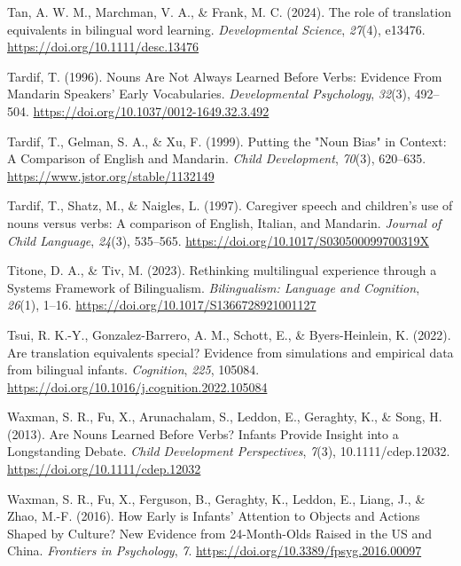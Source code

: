 \documentclass[10pt, letterpaper]{article}
\begin{document}
\begin{CSLReferences}{1}{0}
Tan, A. W. M., Marchman, V. A., \& Frank, M. C. (2024). The role of
translation equivalents in bilingual word learning. \emph{Developmental
Science}, \emph{27}(4), e13476. \url{https://doi.org/10.1111/desc.13476}

Tardif, T. (1996). Nouns {Are Not Always Learned Before Verbs}:
{Evidence From Mandarin Speakers}' {Early Vocabularies}.
\emph{Developmental Psychology}, \emph{32}(3), 492--504.
\url{https://doi.org/10.1037/0012-1649.32.3.492}

Tardif, T., Gelman, S. A., \& Xu, F. (1999). Putting the "{Noun Bias}"
in {Context}: {A Comparison} of {English} and {Mandarin}. \emph{Child
Development}, \emph{70}(3), 620--635.
\url{https://www.jstor.org/stable/1132149}

Tardif, T., Shatz, M., \& Naigles, L. (1997). Caregiver speech and
children's use of nouns versus verbs: {A} comparison of {English},
{Italian}, and {Mandarin}. \emph{Journal of Child Language},
\emph{24}(3), 535--565. \url{https://doi.org/10.1017/S030500099700319X}

Titone, D. A., \& Tiv, M. (2023). Rethinking multilingual experience
through a {Systems Framework} of {Bilingualism}. \emph{Bilingualism:
Language and Cognition}, \emph{26}(1), 1--16.
\url{https://doi.org/10.1017/S1366728921001127}

Tsui, R. K.-Y., Gonzalez-Barrero, A. M., Schott, E., \& Byers-Heinlein,
K. (2022). Are translation equivalents special? {Evidence} from
simulations and empirical data from bilingual infants. \emph{Cognition},
\emph{225}, 105084.
\url{https://doi.org/10.1016/j.cognition.2022.105084}

Waxman, S. R., Fu, X., Arunachalam, S., Leddon, E., Geraghty, K., \&
Song, H. (2013). Are {Nouns Learned Before Verbs}? {Infants Provide
Insight} into a {Longstanding Debate}. \emph{Child Development
Perspectives}, \emph{7}(3), 10.1111/cdep.12032.
\url{https://doi.org/10.1111/cdep.12032}

Waxman, S. R., Fu, X., Ferguson, B., Geraghty, K., Leddon, E., Liang,
J., \& Zhao, M.-F. (2016). How {Early} is {Infants}' {Attention} to
{Objects} and {Actions Shaped} by {Culture}? {New Evidence} from
24-{Month-Olds Raised} in the {US} and {China}. \emph{Frontiers in
Psychology}, \emph{7}. \url{https://doi.org/10.3389/fpsyg.2016.00097}


\end{CSLReferences}
\end{document}
